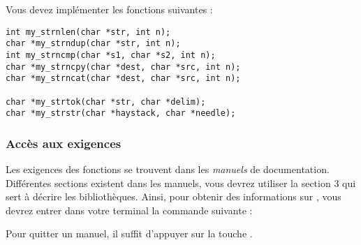

\vspace*{0.7cm}

\noindent {}

\bigskip


\bigskip


\noindent Vous devez implémenter les fonctions suivantes :

\bigskip

\lstset{language=C}
\begin{lstlisting}[frame=single]
int my_strnlen(char *str, int n);
char *my_strndup(char *str, int n);
int my_strncmp(char *s1, char *s2, int n);
char *my_strncpy(char *dest, char *src, int n);
char *my_strncat(char *dest, char *src, int n);

char *my_strtok(char *str, char *delim);
char *my_strstr(char *haystack, char *needle);
\end{lstlisting}


\subsubsection*{Accès aux exigences}

\noindent Les exigences des fonctions se trouvent dans les \textit{manuels} de documentation.
Différentes sections existent dans les manuels, vous devrez utiliser la section $ 3 $ qui sert à décrire les bibliothèques.
Ainsi, pour obtenir des informations sur , vous devrez entrer dans votre terminal la commande suivante : 

\noindent Pour quitter un manuel, il suffit d'appuyer sur la touche  .
